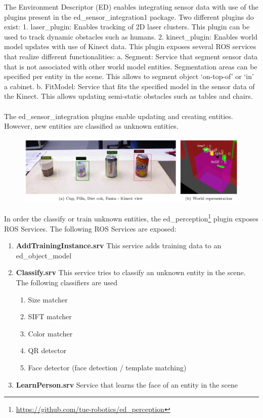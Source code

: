 The Environment Descriptor (ED) enables integrating sensor data with use of the plugins present in the ed\_sensor\_integration1 package. Two different plugins do exist:
1. laser\_plugin: Enables tracking of 2D laser clusters. This plugin can be used to track dynamic obstacles such as humans. 
2. kinect\_plugin: Enables world model updates with use of Kinect data. This plugin exposes several ROS services that realize different functionalities:
a. Segment: Service that segment sensor data that is not associated with other world model entities. Segmentation areas can be specified per entity in the scene. This allows to segment object ‘on-top-of’ or ‘in’ a cabinet.
b. FitModel: Service that fits the specified model in the sensor data of the Kinect. This allows updating semi-static obstacles such as tables and chairs.
\\\\
The ed\_sensor\_integration plugins enable updating and creating entities. However, new entities are classified as unknown entities. 
\begin{figure}[ht]
	\includegraphics[width = \linewidth]{Figures/ed_perception}
	\label{fig:ed_perception}
\end{figure}
In order the classify or train unknown entities, the ed\_perception\footnote{\url{https://github.com/tue-robotics/ed_perception}} plugin exposes ROS Services. The following ROS Services are exposed:
\begin{enumerate}
	\item \textbf{AddTrainingInstance.srv} This service adds training data to an ed\_object\_model
	\item \textbf{Classify.srv} This service tries to classify an unknown entity in the scene. The following classifiers are used
	\begin{enumerate}
		\item Size matcher
		\item SIFT matcher
		\item Color matcher
		\item QR detector
		\item Face detector (face detection / template matching)
	\end{enumerate}
	\item \textbf{LearnPerson.srv} Service that learns the face of an entity in the scene
\end{enumerate}
